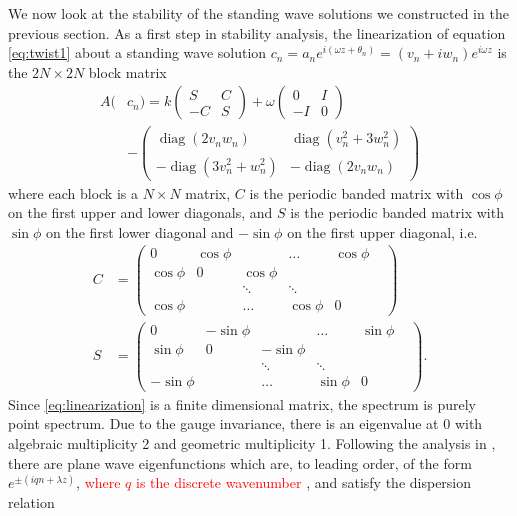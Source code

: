 \documentclass[reprint, amsmath,amssymb,aps,pra]{revtex4-2}
\DeclareMathOperator{\diag}{diag}
\renewcommand{\revised}[1]{ \textcolor{red}{#1} }
\begin{document}
We now look at the stability of the standing wave solutions we constructed in the previous section. As a first step in stability analysis, the linearization of equation \cref{eq:twist1} about a standing wave solution $c_n = a_n e^{i (\omega z + \theta_n) } = (v_n + i w_n)e^{i\omega z}$ is the $2N \times 2N$ block matrix
\begin{equation}\label{eq:linearization}
\begin{aligned}
A(&c_n) =
k \begin{pmatrix}S & C \\ -C & S \end{pmatrix}
+ \omega\begin{pmatrix}0 & I \\ -I & 0 \end{pmatrix} \\
&-\begin{pmatrix} \diag(2v_n w_n) & \diag(v_n^2 + 3 w_n^2) \\
-\diag(3 v_n^2 + w_n^2) & -\diag(2v_n w_n) \end{pmatrix}
\end{aligned}
\end{equation}
where each block is a $N\times N$ matrix, $C$ is the periodic banded matrix with $\cos \phi$ on the first upper and lower diagonals, and $S$ is the periodic banded matrix with $\sin \phi$ on the first lower diagonal and $-\sin \phi$ on the first upper diagonal, i.e.
\begin{align*}
C &= \begin{pmatrix}
0 & \cos \phi & & \dots & \cos \phi \\
\cos \phi & 0 & \cos \phi & & & \\
& & \ddots & \ddots &  & \\
\cos \phi & & \dots & \cos \phi & 0
\end{pmatrix} \\
S &= \begin{pmatrix}
0 & -\sin \phi & & \dots & \sin \phi \\
\sin \phi & 0 & -\sin \phi & & & \\
& & \ddots & \ddots &  & \\
-\sin \phi & & \dots & \sin \phi & 0
\end{pmatrix}.
\end{align*}
Since \cref{eq:linearization} is a finite dimensional matrix, the spectrum is purely point spectrum. Due to the gauge invariance, there is an eigenvalue at 0 with algebraic multiplicity 2 and geometric multiplicity 1. Following the analysis in \cite[Section 2.1.1.1]{Kevrekidis2009}, there are plane wave eigenfunctions which are, to leading order, of the form $e^{\pm( i q n + \lambda z)}$, \revised{where $q$ is the discrete wavenumber}, and satisfy the dispersion relation
\end{document}
